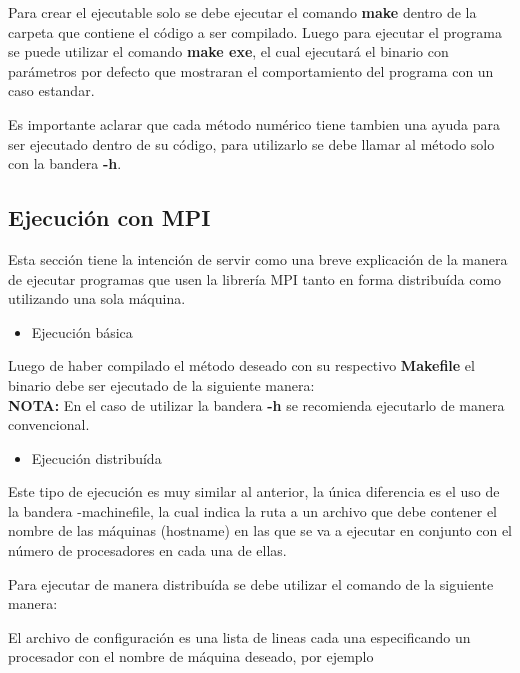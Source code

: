 \documentclass{article}
\begin{document}
Para crear el ejecutable solo se debe ejecutar el comando
\textbf{make} dentro de la carpeta que contiene el código a ser
compilado. Luego para ejecutar el programa se puede utilizar el
comando \textbf{make exe}, el cual ejecutará el binario con
parámetros por defecto que mostraran el comportamiento del programa
con un caso estandar.

Es importante aclarar que cada método numérico tiene tambien una
ayuda para ser ejecutado dentro de su código, para utilizarlo se
debe llamar al método solo con la bandera \textbf{-h}.

\subsection{Ejecución con MPI}

Esta sección tiene la intención de servir como una breve
explicación de la manera de ejecutar programas que usen la
librería MPI tanto en forma distribuída como utilizando una
sola máquina.

\begin{itemize}
    \item Ejecución básica
\end{itemize}

Luego de haber compilado el método deseado con su respectivo
\textbf{Makefile} el binario debe ser ejecutado de la
siguiente manera:\\



\textbf{NOTA:} En el caso de utilizar la bandera
\textbf{-h} se recomienda ejecutarlo de manera convencional.

\begin{itemize}
    \item Ejecución distribuída
\end{itemize}

Este tipo de ejecución es muy similar al anterior, la única
diferencia es el uso de la bandera -machinefile, la cual
indica la ruta a un archivo que debe contener el nombre de
las máquinas (hostname) en las que se va a ejecutar en
conjunto con el número de procesadores en cada una de ellas.

Para ejecutar de manera distribuída se debe utilizar el
comando de la siguiente manera:

\newpage



El archivo de configuración es una lista de lineas cada una
especificando un procesador con el nombre de máquina deseado,
por ejemplo\\
\end{document}
